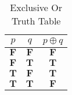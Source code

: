 \begin{table}[htbp]
    \centering
    \begin{tabular}{ccc}
        \toprule
        \(p\)          & \(q\)          & \(p \oplus q\) \\
        \midrule
        \(\mathbf{F}\) & \(\mathbf{F}\) & \(\mathbf{F}\) \\
        \(\mathbf{F}\) & \(\mathbf{T}\) & \(\mathbf{T}\) \\
        \(\mathbf{T}\) & \(\mathbf{F}\) & \(\mathbf{T}\) \\
        \(\mathbf{T}\) & \(\mathbf{T}\) & \(\mathbf{F}\) \\
        \bottomrule
    \end{tabular}
    \caption{Exclusive Or Truth Table}
\end{table}
